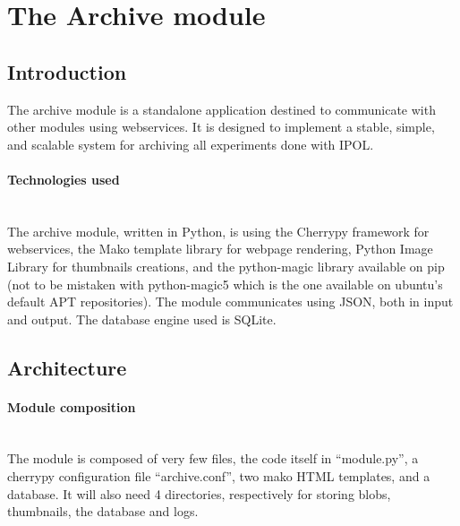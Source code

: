 \section{The Archive module}

\subsection{Introduction}
\label{sec:archive_introduction}

The archive module is a standalone application destined to communicate with other modules using webservices. It is designed to implement a stable, simple, and scalable system for archiving all experiments done with IPOL.

\paragraph{Technologies used} \hspace{0pt} \\
The archive module, written in Python, is using the Cherrypy framework for webservices, the Mako template library for webpage rendering, Python Image Library for thumbnails creations, and the python-magic library available on pip (not to be mistaken with python-magic5 which is the one available on ubuntu's default APT repositories). The module communicates using JSON, both in input and output. The database engine used is SQLite.

\subsection{Architecture}

\paragraph{Module composition} \hspace{0pt} \\
The module is composed of very few files, the code itself in ``module.py'', a cherrypy configuration file ``archive.conf'', two mako HTML templates, and a database. It will also need 4 directories, respectively for storing blobs, thumbnails, the database and logs.

